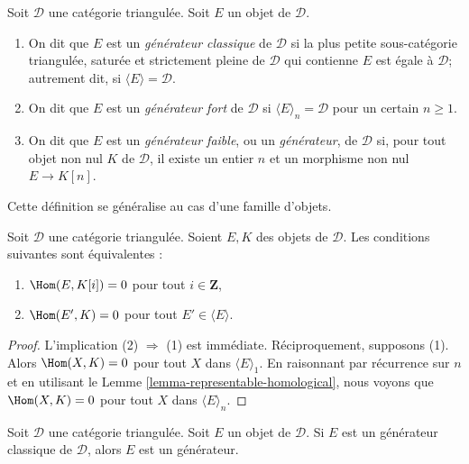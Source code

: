 \begin{definition}
\label{definition-generators}
Soit $\mathcal{D}$ une catégorie triangulée. Soit $E$ un objet de
$\mathcal{D}$.
\begin{enumerate}
\item On dit que $E$ est un {\it générateur classique} de $\mathcal{D}$ si la
plus petite sous-catégorie triangulée, saturée et strictement pleine de
$\mathcal{D}$ qui contienne $E$ est égale à $\mathcal{D}$; autrement dit, si
$\langle E \rangle = \mathcal{D}$.
\item On dit que $E$ est un {\it générateur fort} de $\mathcal{D}$ si
$\langle E \rangle_n = \mathcal{D}$ pour un certain $n \geq 1$.
\item On dit que $E$ est un {\it générateur faible}, ou un
{\it générateur}, de $\mathcal{D}$ si, pour tout objet non nul $K$ de
$\mathcal{D}$, il existe un entier $n$ et un morphisme non nul $E \to K[n]$.
\end{enumerate}
\end{definition}

\noindent
Cette définition se généralise au cas d'une famille d'objets.

\begin{lemma}
\label{lemma-right-orthogonal}
Soit $\mathcal{D}$ une catégorie triangulée. Soient $E, K$ des objets de
$\mathcal{D}$. Les conditions suivantes sont équivalentes :
\begin{enumerate}
\item $\Hom(E, K[i]) = 0$ pour tout $i \in \mathbf{Z}$,
\item $\Hom(E', K) = 0$ pour tout $E' \in \langle E \rangle$.
\end{enumerate}
\end{lemma}

\begin{proof}
L'implication (2) $\Rightarrow$ (1) est immédiate. Réciproquement, supposons
(1). Alors $\Hom(X, K) = 0$ pour tout $X$ dans $\langle E \rangle_1$.
En raisonnant par récurrence sur $n$ et en utilisant le
Lemme \ref{lemma-representable-homological}, nous voyons que
$\Hom(X, K) = 0$ pour tout $X$ dans $\langle E \rangle_n$.
\end{proof}

\begin{lemma}
\label{lemma-classical-generator-generator}
Soit $\mathcal{D}$ une catégorie triangulée. Soit $E$ un objet de
$\mathcal{D}$. Si $E$ est un générateur classique de $\mathcal{D}$, alors
$E$ est un générateur.
\end{lemma}

